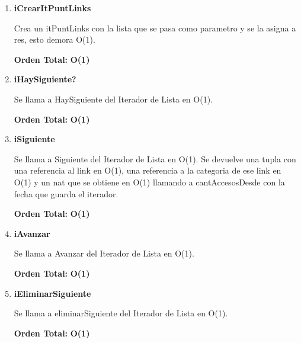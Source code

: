 \vspace*{1em}
\begin{enumerate}

\item\textbf{iCrearItPuntLinks}
\par Crea un itPuntLinks con la lista que se pasa como parametro y se la asigna a res, esto demora O(1).
\par \textbf{Orden Total:} \textbf{O(1)}

\item\textbf{iHaySiguiente?}
\par Se llama a HaySiguiente del Iterador de Lista en O(1).
\par \textbf{Orden Total:} \textbf{O(1)}

\item\textbf{iSiguiente}
\par Se llama a Siguiente del Iterador de Lista en O(1). Se devuelve una tupla con una referencia al link en O(1), una referencia a la categoria de ese link en O(1) y un nat que se obtiene en O(1) llamando a cantAccesosDesde con la fecha que guarda el iterador.
\par \textbf{Orden Total:} \textbf{O(1)}



\item\textbf{iAvanzar}
\par Se llama a Avanzar del Iterador de Lista en O(1).
\par \textbf{Orden Total:} \textbf{O(1)}

\item\textbf{iEliminarSiguiente}
\par Se llama a eliminarSiguiente del Iterador de Lista en O(1).
\par \textbf{Orden Total:} \textbf{O(1)}


\end{enumerate}
